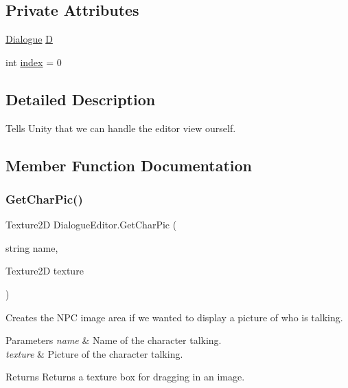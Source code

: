 \subsection*{Private Attributes}
\begin{DoxyCompactItemize}
\item 
\mbox{\hyperlink{class_dialogue}{Dialogue}} \mbox{\hyperlink{class_dialogue_editor_aa05e8f2205c153236f9d2ce81b4857c3}{D}}
\item 
int \mbox{\hyperlink{class_dialogue_editor_a283d0bf74d897ae870ad3bdc7c7dcd2a}{index}} = 0
\end{DoxyCompactItemize}


\subsection{Detailed Description}
Tells Unity that we can handle the editor view ourself. 



\subsection{Member Function Documentation}
\mbox{\label{class_dialogue_editor_a797c90eb2333c7e9421917ecef6da189}} 
\subsubsection{\texorpdfstring{Get\+Char\+Pic()}{GetCharPic()}}
{\footnotesize\ttfamily Texture2D Dialogue\+Editor.\+Get\+Char\+Pic (\begin{DoxyParamCaption}\item[{string}]{name,  }\item[{Texture2D}]{texture }\end{DoxyParamCaption})\hspace{0.3cm}{\ttfamily [private]}}



Creates the N\+PC image area if we wanted to display a picture of who is talking. 


\begin{DoxyParams}{Parameters}
{\em name} & Name of the character talking.\\
\hline
{\em texture} & Picture of the character talking.\\
\hline
\end{DoxyParams}
\begin{DoxyReturn}{Returns}
Returns a texture box for dragging in an image.
\end{DoxyReturn}
\mbox{\label{class_dialogue_editor_a7c45fc0781ade3441db9948bc4b3ec39}} 
